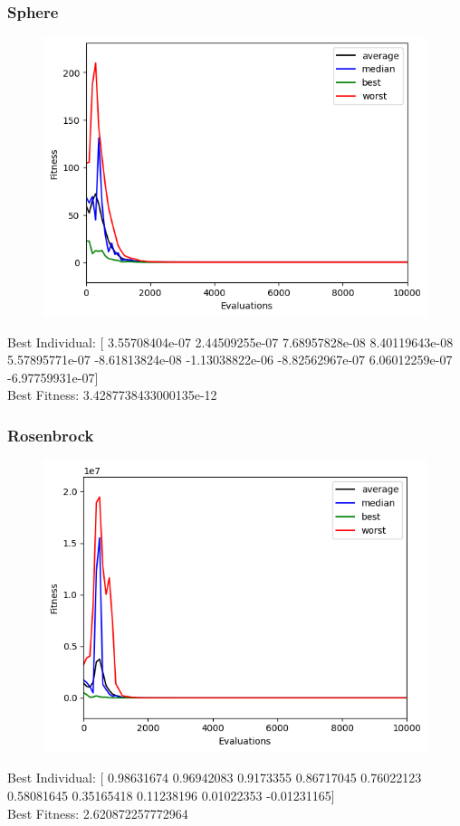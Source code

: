 \subsubsection{Sphere}
\begin{figure}[H]
    \centering
    \includegraphics[width=\linewidth]{images/lab3/sph_cma.png}
\end{figure}
Best Individual: [ 3.55708404e-07  2.44509255e-07  7.68957828e-08  8.40119643e-08 5.57895771e-07 -8.61813824e-08 -1.13038822e-06 -8.82562967e-07 6.06012259e-07 -6.97759931e-07] \\
Best Fitness: 3.4287738433000135e-12

\subsubsection{Rosenbrock}
\begin{figure}[H]
    \centering
    \includegraphics[width=\linewidth]{images/lab3/ros_cma.png}
\end{figure}
Best Individual: [ 0.98631674  0.96942083  0.9173355   0.86717045  0.76022123  0.58081645 0.35165418  0.11238196  0.01022353 -0.01231165] \\
Best Fitness: 2.620872257772964

